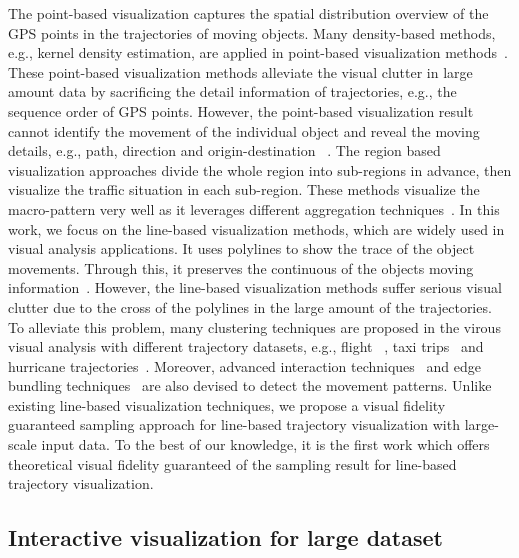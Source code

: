 The point-based visualization captures the spatial distribution overview of the GPS points in the trajectories of moving objects.
Many density-based methods, e.g., kernel density estimation, are applied in point-based visualization methods~\cite{liu2013vait,yang2016exploring,chae2014public,xie2008kernel, borruso2008network}.
These point-based visualization methods alleviate the visual clutter in large amount data by sacrificing the detail information of trajectories, e.g., the sequence order of GPS points.
However, the point-based visualization result cannot identify the movement of the individual object and reveal the moving details, e.g., path, direction and origin-destination ~\cite{chen2015survey}.
The region based visualization approaches divide the whole region into sub-regions in advance,
then visualize the traffic situation in each sub-region.
These methods visualize the macro-pattern very well as it leverages different aggregation techniques~\cite{guo2009flow,wood2010visualisation,von2015mobilitygraphs}.
In this work, we focus on the line-based visualization methods, which are widely used in visual analysis applications.
It uses polylines to show the trace of the object movements.
Through this, it preserves the continuous of the objects moving information~\cite{guo2011tripvista,hurter2009fromdady}.
However, the line-based visualization methods suffer serious visual clutter due to the cross of the polylines in the large amount of the trajectories.
To alleviate this problem, many clustering techniques are proposed in the virous visual analysis with different trajectory datasets, e.g., flight ~\cite{ferreira2013vector}, taxi trips~\cite{rinzivillo2008visually} and hurricane trajectories~\cite{andrienko2017clustering}.
Moreover, advanced interaction techniques~\cite{kruger2013trajectorylenses, ferreira2013visual} and edge bundling techniques~\cite{zeng2019route} are also devised to detect the movement patterns.
Unlike existing line-based visualization techniques, we propose a visual fidelity  guaranteed sampling approach for line-based trajectory visualization with large-scale input data.
To the best of our knowledge, it is the first work which offers theoretical visual fidelity guaranteed of the sampling result for line-based trajectory visualization.





\subsection{Interactive visualization for large dataset}\label{sec:interactive}

